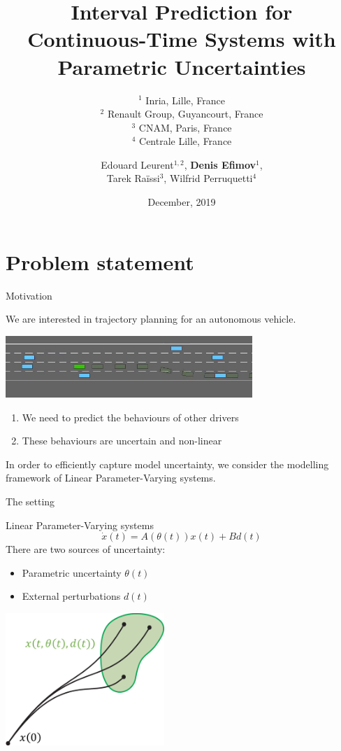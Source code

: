 \documentclass[slideopt,A4,showboxes,svgnames]{beamer}
\title[Interval Prediction with Parametric Uncertainties]{Interval Prediction for \\ Continuous-Time Systems with \\ Parametric Uncertainties}
\subtitle{$^1$ Inria, Lille, France\\
$^2$ Renault Group, Guyancourt, France\\
$^3$ CNAM, Paris, France\\
$^4$ Centrale Lille, France}
\date[December, 2019]{December, 2019}
\author[Denis Efimov]{Edouard Leurent$^{1,2}$, \textbf{Denis Efimov}$^1$, \\Tarek Ra\"issi$^3$, Wilfrid Perruquetti$^4$}
\begin{document}
\begin{frame}
    \titlepage
\end{frame}

\frame{\tocpage}
 
\section{Problem statement}

\frame{\sectionpage}

\begin{frame}{Motivation}

We are interested in \alert{trajectory planning} for an autonomous vehicle.
 
 \begin{center}
 \href{https://github.com/eleurent/highway-env\#highway}{
 \includegraphics[width=0.7\textwidth]{img/highway-env}}    
 \end{center}

\begin{enumerate}
    \item We need to \alert{predict} the behaviours of other drivers
    \item These behaviours are {\red uncertain} and {\red non-linear}
\end{enumerate}
\vspace*{\baselineskip}
In order to efficiently capture model uncertainty, we consider the modelling framework of \alert{Linear Parameter-Varying} systems.

\end{frame}

\begin{frame}{The setting}
\begin{block}{Linear Parameter-Varying systems}
	\begin{equation*}
	\dot{x}(t)=A(\theta(t))x(t)+Bd(t)\label{eq:LPV_syst}
	\end{equation*}
	There are two sources of uncertainty:
	\begin{itemize}
		\item Parametric uncertainty $\theta(t)$
		\item External perturbations $d(t)$
	\end{itemize}
\end{block}

\centering
\includegraphics[width=0.45\textwidth]{img/interval-hull-0}
\end{frame}
\end{document}
